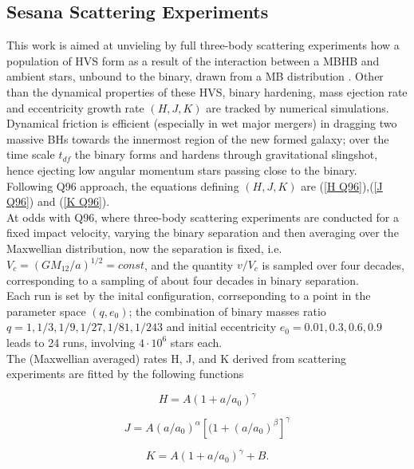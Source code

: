 \documentclass[12pt,twoside,openany]{book}
\begin{document}
\subsection{Sesana Scattering Experiments}
This work \cite{Sesana_2006} is aimed at unvieling by  full three-body scattering experiments how a population of HVS form as a result of the interaction between a MBHB and ambient stars, unbound to the binary, drawn from a MB distribution . Other than the dynamical properties of these HVS, binary hardening, mass ejection rate and eccentricity growth rate $(H,J,K)$ are tracked by numerical simulations.\\Dynamical friction is efficient (especially in wet major mergers) in dragging two  massive BHs towards the innermost region of the new formed galaxy; over the time scale $t_{df}$ the binary forms and hardens  through gravitational slingshot, hence ejecting low angular momentum stars passing close to the binary. \\Following Q96 approach, the equations defining $(H,J,K)$ are (\ref{H Q96}),(\ref{J Q96}) and (\ref{K Q96}).\\At odds with Q96, where three-body scattering experiments are conducted for a fixed impact velocity, varying the binary separation and then averaging over the Maxwellian distribution, now the separation is fixed, i.e. $V_c=(GM_{12}/a)^{1/2}=const$, and the quantity $v/V_c$ is sampled over four decades, corresponding to a sampling of about four decades in binary separation.\\Each run is set by the inital configuration, corrseponding to a point in the parameter space $(q,e_0)$; the combination of binary masses ratio $q=1,1/3,1/9,1/27,1/81,1/243$ and initial eccentricity $e_0=0.01,0.3,0.6,0.9$ leads to 24 runs, involving $4\cdot10^6$ stars each.\\The (Maxwellian averaged) rates H, J,
and K derived from scattering experiments are fitted by the following functions


 \begin{equation}
     H=A(1+a/a_0)^\gamma
\end{equation}

 \begin{equation}
    J=A(a/a_0)^\alpha [(1+(a/a_0)^\beta]^\gamma
\end{equation}

\begin{equation}
    K=A(1+a/a_0)^\gamma+B.
\end{equation}
\end{document}
